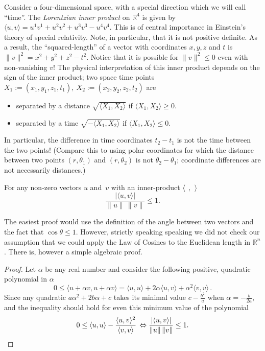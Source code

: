 \begin{example}\label{lorentzex}
Consider a four-dimensional space, with a special direction which we will call ``time''.  The \hypertarget{lorentzian_metric}{\emph{Lorentzian inner product}} on $\mathbb{R}^4$ is given by $\langle u,v \rangle = u^1v^1 + u^2v^2 + u^3v^3 - u^4v^4$.  This is of central importance in Einstein's theory of special relativity. Note, in particular,  that it is not positive definite.
As a result, the ``squared-length'' of a vector with coordinates $x, y, z$ and $t$ is $\|v\|^2 = x^2 + y^2 + z^2 - t^2$.  Notice that it is possible for $\|v\|^2\leq 0$ even with non-vanishing $v$!  
The physical interpretation of this inner product depends on the sign of the inner product; two space time points $X_1:=(x_1,y_1,z_1,t_1),~X_2:=(x_2,y_2,z_2,t_2)$  are 
\begin{itemize}
\item separated by a distance $\sqrt{ \langle X_1, X_2\rangle }$  if $\langle X_1, X_2\rangle \geq 0$.\\
\item separated by a time $\sqrt{ -\langle X_1, X_2\rangle }$  if $\langle X_1, X_2\rangle \leq 0.$
\end{itemize}
In particular, the difference in time coordinates $t_2-t_1$ is not the time between the two points! (Compare this to using polar coordinates for which the distance between two points $(r,\theta_1)$ and $(r,\theta_2)$ is not $\theta_2-\theta_1$; coordinate differences are not necessarily distances.)
\end{example}



\begin{theorem}
For any non-zero vectors $u$ and~$v$ with an inner-product $\langle\:\  ,\:\,  \rangle$
\[ 
\frac{|\langle u,v \rangle|}{\|u\|\, \|v\|} \leq 1.
\]
\end{theorem}

The easiest proof would use the definition of the angle between two vectors and the fact that $\cos \theta \leq 1$. However, strictly speaking speaking we did not check our assumption that we could apply the Law of Cosines
to the Euclidean length in ${\mathbb R}^n$. There is, however a simple algebraic proof. 
\begin{proof}
Let $\alpha$ be any
real number and consider the following positive, quadratic polynomial in $\alpha$
\[
0\leq \langle u+\alpha v,u+\alpha v\rangle = \langle u,u\rangle +2\alpha \langle u,v\rangle +\alpha^2 \langle v,v\rangle\, .
\]
Since any quadratic $a\alpha^2 + 2b \alpha + c$ takes its minimal value
$c-\frac{b^2}{a}$
when $\alpha=-\frac{b}{2a}$,  and the inequality should hold for even this minimum value of the polynomial 
\[
0\leq \langle u,u\rangle -\frac{\langle u,v\rangle^2}{\langle v,v\rangle}\, 
\Leftrightarrow 
\frac{|\langle u,v \rangle|}{\|u\|\, \|v\|} \leq 1.\qedhere
\]
\end{proof}

